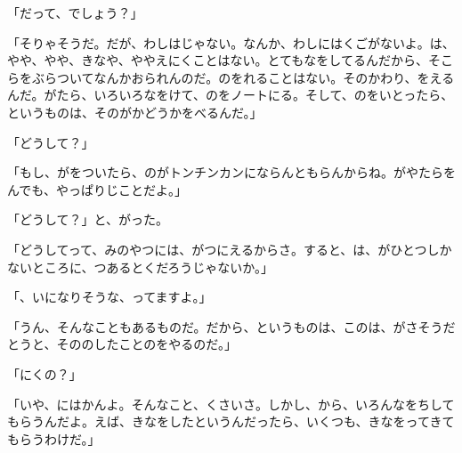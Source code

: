 「だって、でしょう？」

「そりゃそうだ。だが、わしはじゃない。なんか、わしにはくごがないよ。は、やや、やや、きなや、ややえにくことはない。とてもなをしてるんだから、そこらをぶらついてなんかおられんのだ。のをれることはない。そのかわり、をえるんだ。がたら、いろいろなをけて、のをノートにる。そして、のをいとったら、というものは、そのがかどうかをべるんだ。」

「どうして？」

「もし、がをついたら、のがトンチンカンにならんともらんからね。がやたらをんでも、やっぱりじことだよ。」

「どうして？」と、がった。

「どうしてって、みのやつには、がつにえるからさ。すると、は、がひとつしかないところに、つあるとくだろうじゃないか。」

「、いになりそうな、ってますよ。」

「うん、そんなこともあるものだ。だから、というものは、このは、がさそうだとうと、そののしたことのをやるのだ。」

「にくの？」

「いや、にはかんよ。そんなこと、くさいさ。しかし、から、いろんなをちしてもらうんだよ。えば、きなをしたというんだったら、いくつも、きなをってきてもらうわけだ。」

